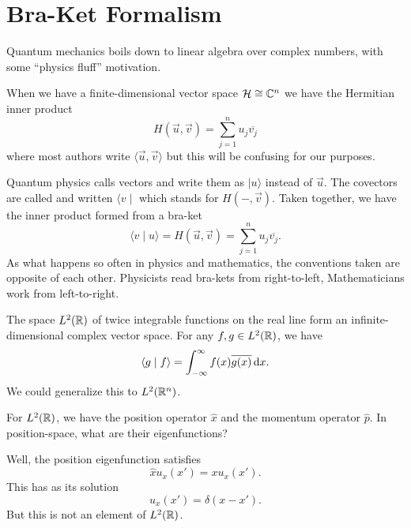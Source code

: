 \section{Bra-Ket Formalism}

\M
Quantum mechanics boils down to linear algebra over complex numbers,
with some ``physics fluff'' motivation.

When we have a finite-dimensional vector space $\mathcal{H}\cong\mathbb{C}^{n}$
we have the Hermitian inner product
\begin{equation}
H(\vec{u}, \vec{v}) = \sum^{n}_{j=1}u_{j}\overline{v_{j}}
\end{equation}
where most authors write $\langle\vec{u},\vec{v}\rangle$ but this will
be confusing for our purposes.

Quantum physics calls vectors  and write them as
$\mid u\rangle$ instead of $\vec{u}$. The covectors are called 
and written $\langle v\mid$ which stands for $H(-,\vec{v})$. Taken
together, we have the inner product formed from a bra-ket
\begin{equation}
\langle v\mid u\rangle = H(\vec{u},\vec{v}) = \sum^{n}_{j=1}u_{j}\overline{v_{j}}.
\end{equation}
As what happens so often in physics and mathematics, the conventions
taken are opposite of each other. Physicists read bra-kets from
right-to-left, Mathematicians work from left-to-right.

\begin{example}
The space $L^{2}(\mathbb{R})$ of twice integrable functions on the real line
form an infinite-dimensional complex vector space. For any $f,g\in L^{2}(\mathbb{R})$,
we have
\begin{equation}
\langle g\mid f\rangle = \int^{\infty}_{-\infty}f(x)\overline{g(x)}\,\mathrm{d} x.
\end{equation}
We could generalize this to $L^{2}(\mathbb{R}^{n})$.
\end{example}

For $L^{2}(\mathbb{R})$, we have the position operator $\widehat{x}$ and the
momentum operator $\widehat{p}$. In position-space, what are their
eigenfunctions?

Well, the position eigenfunction satisfies
\begin{equation}
\widehat{x}u_{x}(x') = xu_{x}(x').
\end{equation}
This has as its solution
\begin{equation}
u_{x}(x') = \delta(x-x').
\end{equation}
But this is not an element of $L^{2}(\mathbb{R})$.

